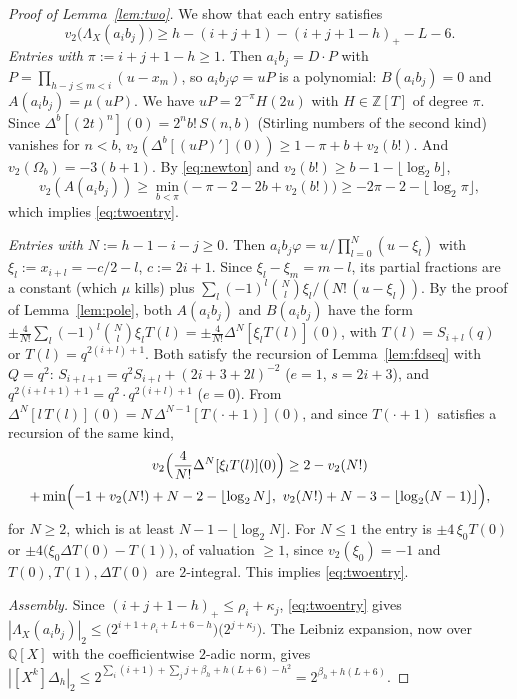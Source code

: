 \documentclass[11pt]{amsart}
\theoremstyle{definition}
\theoremstyle{remark}
\numberwithin{equation}{section}
\newcommand{\ZZ}{\mathbb{Z}}
\newcommand{\QQ}{\mathbb{Q}}
\begin{document}
\begin{proof}[Proof of Lemma~\ref{lem:two}]
We show that each entry satisfies
\begin{equation}\label{eq:twoentry}
  v_2\bigl(\Lambda_X(a_ib_j)\bigr)\ge h-(i+j+1)-(i+j+1-h)_+-L-6 .
\end{equation}
\emph{Entries with $\pi:=i+j+1-h\ge1$.} Then $a_ib_j=D\cdot P$ with $P=\prod_{h-j\le m<i}(u-x_m)$, so $a_ib_j\varphi=uP$
is a polynomial: $B(a_ib_j)=0$ and $A(a_ib_j)=\mu(uP)$. We have $uP=2^{-\pi}H(2u)$ with $H\in\ZZ[T]$ of degree $\pi$.
Since $\Delta^b[(2t)^n](0)=2^nb!\,S(n,b)$ (Stirling numbers of the second kind) vanishes for $n<b$,
$v_2(\Delta^b[(uP)'](0))\ge1-\pi+b+v_2(b!)$. And $v_2(\Omega_b)=-3(b+1)$. By \eqref{eq:newton} and
$v_2(b!)\ge b-1-\lfloor\log_2b\rfloor$,
\[
  v_2(A(a_ib_j))\ge\min_{b<\pi}\bigl(-\pi-2-2b+v_2(b!)\bigr)\ge-2\pi-2-\lfloor\log_2\pi\rfloor ,
\]
which implies \eqref{eq:twoentry}.

\emph{Entries with $N:=h-1-i-j\ge0$.} Then $a_ib_j\varphi=u/\prod_{l=0}^{N}(u-\xi_l)$ with $\xi_l:=x_{i+l}=-c/2-l$,
$c:=2i+1$. Since $\xi_l-\xi_m=m-l$, its partial fractions are a constant (which $\mu$ kills) plus
$\sum_l(-1)^l\binom Nl\xi_l/(N!\,(u-\xi_l))$. By the proof of Lemma~\ref{lem:pole}, both $A(a_ib_j)$ and $B(a_ib_j)$ have the form
$\pm\frac4{N!}\sum_l(-1)^l\binom Nl\xi_lT(l)=\pm\frac4{N!}\Delta^N[\xi_lT(l)](0)$, with $T(l)=S_{i+l}(q)$ or
$T(l)=q^{2(i+l)+1}$. Both satisfy the recursion of Lemma~\ref{lem:fdseq} with $Q=q^2$: $S_{i+l+1}=q^2S_{i+l}+(2i+3+2l)^{-2}$
($e=1$, $s=2i+3$), and $q^{2(i+l+1)+1}=q^2\cdot q^{2(i+l)+1}$ ($e=0$). From $\Delta^N[l\,T(l)](0)=N\,\Delta^{N-1}[T(\cdot+1)](0)$, and
since $T(\cdot+1)$ satisfies a recursion of the same kind,
\begin{multline*}
  v_2\Bigl(\frac4{N!}\Delta^N[\xi_lT(l)](0)\Bigr)\ge2-v_2(N!)\\
  +\min\Bigl(-1+v_2(N!)+N-2-\lfloor\log_2N\rfloor,\ v_2(N!)+N-3-\lfloor\log_2(N-1)\rfloor\Bigr),
\end{multline*}
for $N\ge2$, which is at least $N-1-\lfloor\log_2N\rfloor$. For $N\le1$ the entry is $\pm4\,\xi_0T(0)$ or
$\pm4\bigl(\xi_0\Delta T(0)-T(1)\bigr)$, of valuation $\ge1$, since $v_2(\xi_0)=-1$ and $T(0),T(1),\Delta T(0)$ are
$2$-integral. This implies \eqref{eq:twoentry}.

\emph{Assembly.} Since $(i+j+1-h)_+\le\rho_i+\kappa_j$, \eqref{eq:twoentry} gives
$|\Lambda_X(a_ib_j)|_2\le\bigl(2^{i+1+\rho_i+L+6-h}\bigr)\bigl(2^{j+\kappa_j}\bigr)$. The Leibniz expansion, now over
$\QQ[X]$ with the coefficientwise $2$-adic norm, gives
$|[X^k]\Delta_h|_2\le2^{\sum_i(i+1)+\sum_jj+\beta_h+h(L+6)-h^2}=2^{\beta_h+h(L+6)}$.
\end{proof}
\end{document}
